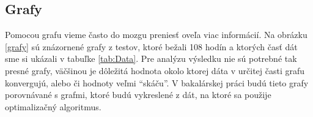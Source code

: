 \subsection{Grafy}



Pomocou grafu vieme často do mozgu preniesť oveľa viac informácií. 
Na obrázku  \ref{grafy} sú znázornené grafy z testov, ktoré bežali 108 hodín a ktorých časť dát sme si ukázali v tabuľke  \ref{tab:Data}. Pre analýzu výsledku nie sú potrebné tak presné grafy, väčšinou je dôležitá hodnota okolo ktorej dáta v určitej časti grafu konvergujú, alebo či hodnoty veľmi ``skáču''. V bakalárskej práci budú tieto grafy porovnávané s grafmi, ktoré budú vykreslené z dát, na ktoré sa použije optimalizačný algoritmus.




